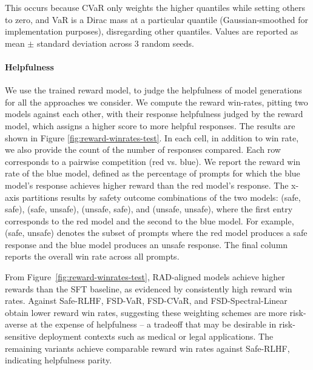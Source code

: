 \begin{table}[t]
{    This occurs because CVaR only weights the higher quantiles while setting others to zero, and VaR is a Dirac mass at a particular quantile (Gaussian-smoothed for implementation purposes), disregarding other quantiles. Values are reported as mean $\pm$ standard deviation across 3 random seeds.
  }
  \label{tab:cost-dominance}
\end{table}

\paragraph{Helpfulness}

We use the trained reward model, to judge the helpfulness of model generations for all the approaches we consider. We compute the reward win-rates, pitting two models against each other, with their response helpfulness judged by the reward model, which assigns a higher score to more helpful responses. The results are shown in Figure \ref{fig:reward-winrates-test}. In each cell, in addition to win rate, we also provide the count of the number of responses compared. Each row corresponds to a pairwise competition (red vs. blue). We report the reward win rate of the blue model, defined as the percentage of prompts for which the blue model's response achieves higher reward than the red model's response. The x-axis partitions results by safety outcome combinations of the two models: (safe, safe), (safe, unsafe), (unsafe, safe), and (unsafe, unsafe), where the first entry corresponds to the red model and the second to the blue model. For example, (safe, unsafe) denotes the subset of prompts where the red model produces a safe response and the blue model produces an unsafe response. The final column reports the overall win rate across all prompts. 

From Figure~\ref{fig:reward-winrates-test}, RAD-aligned models achieve higher rewards than the SFT baseline, as evidenced by consistently high reward win rates. Against Safe-RLHF, FSD-VaR, FSD-CVaR, and FSD-Spectral-Linear obtain lower reward win rates, suggesting these weighting schemes are more risk-averse at the expense of helpfulness -- a tradeoff that may be desirable in risk-sensitive deployment contexts such as medical or legal applications. The remaining variants achieve comparable reward win rates against Safe-RLHF, indicating helpfulness parity.


